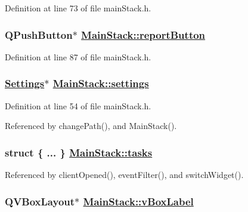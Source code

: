 Definition at line 73 of file main\-Stack.h.\hypertarget{classMainStack_r28}{
\subsubsection[reportButton]{\setlength{\rightskip}{0pt plus 5cm}QPush\-Button$\ast$ \hyperlink{classMainStack_r28}{Main\-Stack::report\-Button}}}
\label{classMainStack_r28}


Definition at line 87 of file main\-Stack.h.\hypertarget{classMainStack_r1}{
\subsubsection[settings]{\setlength{\rightskip}{0pt plus 5cm}\hyperlink{classSettings}{Settings}$\ast$ \hyperlink{classMainStack_r1}{Main\-Stack::settings}}}
\label{classMainStack_r1}


Definition at line 54 of file main\-Stack.h.

Referenced by change\-Path(), and Main\-Stack().\hypertarget{classMainStack_r33}{
\subsubsection[tasks]{\setlength{\rightskip}{0pt plus 5cm}struct \{ ... \}   \hyperlink{classMainStack_r33}{Main\-Stack::tasks}}}
\label{classMainStack_r33}




Referenced by client\-Opened(), event\-Filter(), and switch\-Widget().\hypertarget{classMainStack_r20}{
\subsubsection[vBoxLabel]{\setlength{\rightskip}{0pt plus 5cm}QVBox\-Layout$\ast$ \hyperlink{classMainStack_r20}{Main\-Stack::v\-Box\-Label}}}
\label{classMainStack_r20}


